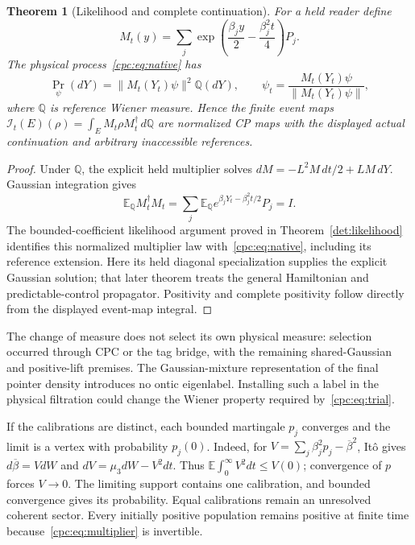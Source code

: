\documentclass[11pt,oneside,openany]{book}
\newtheorem{theorem}{Theorem}[chapter]
\theoremstyle{definition}
\theoremstyle{remark}\newtheorem{remark}[theorem]{Remark}
\begin{document}
\begin{theorem}[Likelihood and complete continuation]
\label{cpc:thm:likelihood}
For a held reader define
\begin{equation}
 M_t(y)=\sum_j\exp\left(\frac{\beta_jy}{2}-\frac{\beta_j^2t}{4}\right)P_j.
 \label{cpc:eq:multiplier}
\end{equation}
The physical process~\eqref{cpc:eq:native} has
\begin{equation}
 \Pr_\psi(dY)=\|M_t(Y_t)\psi\|^2\mathbb Q(dY),\qquad
 \psi_t=\frac{M_t(Y_t)\psi}{\|M_t(Y_t)\psi\|},
 \label{cpc:eq:likelihood}
\end{equation}
where $\mathbb Q$ is reference Wiener measure. Hence the finite event maps
$\mathcal I_t(E)(\rho)=\int_E M_t\rho M_t^\dagger\,d\mathbb Q$
are normalized CP maps with the displayed actual continuation and arbitrary inaccessible references.
\end{theorem}
\begin{proof}
Under $\mathbb Q$, the explicit held multiplier solves $dM=-L^2M\,dt/2+LM\,dY$. Gaussian integration gives
\[
 \mathbb E_{\mathbb Q}M_t^\dagger M_t
 =\sum_j\mathbb E_{\mathbb Q}e^{\beta_jY_t-\beta_j^2t/2}P_j=I.
\]
The bounded-coefficient likelihood argument proved in Theorem~\ref{det:likelihood} identifies this normalized multiplier law with~\eqref{cpc:eq:native}, including its reference extension. Here its held diagonal specialization supplies the explicit Gaussian solution; that later theorem treats the general Hamiltonian and predictable-control propagator. Positivity and complete positivity follow directly from the displayed event-map integral.
\end{proof}

The change of measure does not select its own physical measure: selection occurred through CPC or the tag bridge, with the remaining shared-Gaussian and positive-lift premises. The Gaussian-mixture representation of the final pointer density introduces no ontic eigenlabel. Installing such a label in the physical filtration could change the Wiener property required by~\eqref{cpc:eq:trial}.

If the calibrations are distinct, each bounded martingale $p_j$ converges and the limit is a vertex with probability $p_j(0)$. Indeed, for $V=\sum_j\beta_j^2p_j-\overline\beta^2$, It\^o gives $d\overline\beta=VdW$ and $dV=\mu_3dW-V^2dt$. Thus $\mathbb E\int_0^\infty V^2dt\le V(0)$; convergence of $p$ forces $V\to0$. The limiting support contains one calibration, and bounded convergence gives its probability. Equal calibrations remain an unresolved coherent sector. Every initially positive population remains positive at finite time because~\eqref{cpc:eq:multiplier} is invertible.
\end{document}
